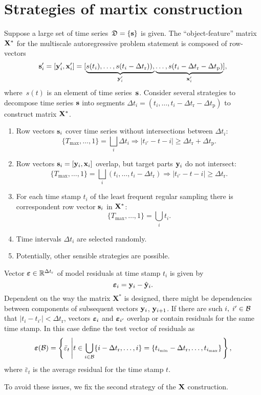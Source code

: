 \documentclass[12pt]{article}
\newcommand{\dtr}{\Delta t_\text{r}}
\newcommand{\dtp}{\Delta t_\text{p}}
\begin{document}
\section{Strategies of martix construction}
Suppose a large set of time series~${\mathfrak{D}}=\{{\mathbf{s}}\}$ is given. The ``object-feature'' matrix~${\mathbf{X}}^*$ for the multiscale autoregressive problem statement is composed of row-vectors
\[
{\mathbf{s}}_i^\prime = [{\mathbf{y}}_i^\prime, {\mathbf{x}}_i^\prime] = [\underbrace{s(t_i),\dots,s(t_i-\Delta t_\text{r})),}_{{\mathbf{y}}_i^\prime}
\underbrace{\dots,s(t_i-\Delta t_\text{r}-\Delta t_\text{p})}_{{\mathbf{x}}_i^\prime}],
\]
where~$s(t)$ is an element of time series~${\mathbf{s}}$. Consider several strategies to decompose time series ${\mathbf{s}}$ into segments $\Delta t_i = (t_i,\dots,t_i-\Delta t_\text{r}-\Delta t_\text{p})$ to construct  matrix ${\mathbf{X}}^{*}$.
\begin{enumerate}
\item Row vectors ${\mathbf{s}}_i$ cover time series without intersections between $\Delta t_i$:
\[\{T_{\max}, \dots, 1\} = \bigsqcup_i \Delta t_i \Rightarrow |t_{i'} - t-i| \geq \dtr + \dtp.\]
\item Row vectors ${\mathbf{s}}_i = [{\mathbf{y}}_i, {\mathbf{x}}_i]$ overlap, but target parts  ${\mathbf{y}}_i$ do not intersect:
    \[\{T_{\max}, \dots, 1\} = \bigsqcup_i (t_i,\dots,t_i-\Delta t_\text{r}) \Rightarrow |t_{i'} - t-i| \geq \dtr. \]
\item For each time stamp $t_i$ of the least frequent regular sampling there is correspondent row vector ${\mathbf{s}}_i$ in ${\mathbf{X}}^{*}$:
    \[\{T_{\max}, \dots, 1\} = \bigcup_i t_i. \]
\item Time intervals $\Delta t_i$ are selected randomly.
\item Potentially, other sensible strategies are possible.    
\end{enumerate}
 Vector $\veps \in \mathbb{R}^{\dtr}$ of model residuals at time stamp $t_i$ is given by
\[{\boldsymbol{\varepsilon}}_i = {{\mathbf{y}}}_i - \hat{{\mathbf{y}}}_i.\]
Dependent on the way the matrix $\mathbf{X}^{*}$ is designed, there might be dependencies between components of subsequent vectors ${\mathbf{y}}_{i}$, ${\mathbf{y}}_{i+1}$.
If there are such $i, \; i' \in {\mathcal{B}}$ that $|t_i - t_{i'}| < \dtr$, vectors ${\boldsymbol{\varepsilon}}_i$ and ${\boldsymbol{\varepsilon}}_{i'}$ overlap or contain residuals for the same time stamp. In this case define the test vector of residuals as
\[\veps(\cB) = \left\{\bar{\varepsilon}_t \left| t \in \bigcup_{i \in \cB} \{i-\dtr, \dots, i\} = \{t_{i_{\min}} - \dtr, \dots, t_{i_{\max}}\}\right.\right\}, \]
where $\bar{\varepsilon}_t$ is the average residual for the time stamp $t$.

To avoid these issues, we fix the second strategy of the ${\mathbf{X}}$ construction.
\end{document}
